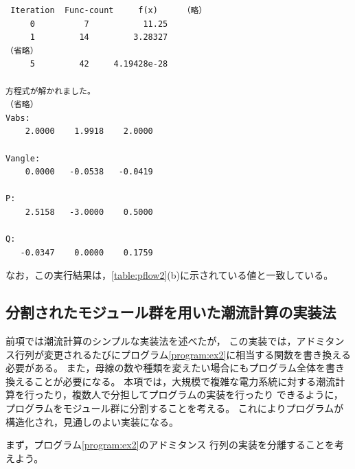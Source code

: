\documentclass[tombow,dvipdfmx]{corona-a5-1.1}
\begin{document}
\begin{例}[潮流計算の実装法]
\smallskip
\begin{実行結果}
\begin{verbatim}
 Iteration  Func-count     f(x)     （略）
     0          7           11.25 
     1         14         3.28327 
（省略）
     5         42     4.19428e-28

方程式が解かれました。
（省略）
Vabs:
    2.0000    1.9918    2.0000

Vangle:
    0.0000   -0.0538   -0.0419

P:
    2.5158   -3.0000    0.5000

Q:
   -0.0347    0.0000    0.1759
\end{verbatim}
\end{実行結果}

なお，この実行結果は，\ref{table:pflow2}(b)に示されている値と一致している。
\end{例}

\subsection{分割されたモジュール群を用いた潮流計算の実装法}
前項では潮流計算のシンプルな実装法を述べたが，
この実装では，アドミタンス行列が変更されるたびにプログラム\nobreak\ref{program:ex2}に相当する関数を書き換える必要がある。
また，母線の数や種類を変えたい場合にもプログラム全体を書き換えることが必要になる。
本項では，大規模で複雑な電力系統に対する潮流計算を行ったり，複数人で分担してプログラムの実装を行ったり
できるように，
プログラムをモジュール群に分割することを考える。
これによりプログラムが構造化され，見通しのよい実装になる。

まず，プログラム\nobreak\ref{program:ex2}のアドミタンス
行列の実装を分離することを考えよう。
\end{document}
